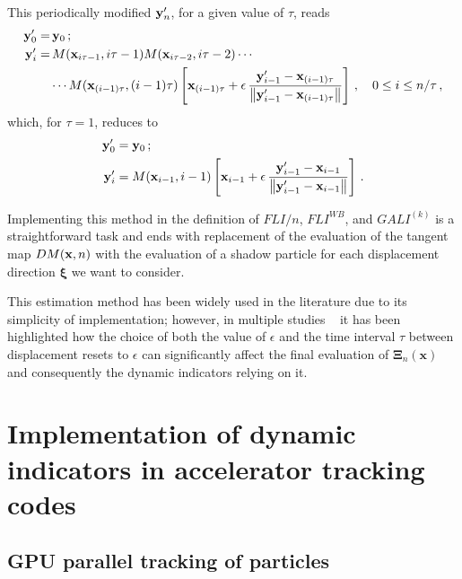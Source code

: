 This periodically modified $\vb{y}'_n$, for a given value of $\tau$, reads
\begin{equation}
    \begin{aligned}
        \vb{y}'_0 =&\, \vb{y}_0 \,;  \\
        \vb{y}'_i =&\, M(\vb{x}_{i\tau - 1}, i\tau - 1)M(\vb{x}_{i\tau - 2}, i\tau - 2)\cdots \\
        &\cdots M(\vb{x}_{(i-1)\tau}, (i-1)\tau)\left[\vb{x}_{(i-1)\tau}+\epsilon\,\frac{\vb{y}'_{i-1}-\vb{x}_{(i-1)\tau}}{\norm{\vb{y}'_{i-1}-\vb{x}_{(i-1)\tau}}}\right]\,, \quad 0 \leq i \leq n/\tau \,,        
    \end{aligned}
\end{equation}
which, for $\tau=1$, reduces to
\begin{equation}
\begin{aligned}
    \vb{y}'_0 &= \vb{y}_0 \,; \\
    \vb{y}'_i &= M(\vb{x}_{i-1}, i-1)\left[\vb{x}_{i-1}+\epsilon\,\frac{\vb{y}'_{i-1}-\vb{x}_{i-1}}{\norm{\vb{y}'_{i-1}-\vb{x}_{i-1}}}\right]\,.
\end{aligned}
\end{equation}

Implementing this method in the definition of $FLI/n$, $FLI^{WB}$, and $GALI^{(k)}$ is a straightforward task and ends with replacement of the evaluation of the tangent map $DM(\vb{x}, n)$ with the evaluation of a shadow particle for each displacement direction $\boldsymbol{\xi}$ we want to consider.

This estimation method has been widely used in the literature due to its simplicity of implementation; however, in multiple studies ~\cite{Tancredi_2001, Skokos2010b} it has been highlighted how the choice of both the value of $\epsilon$ and the time interval $\tau$ between displacement resets to $\epsilon$ can significantly affect the final evaluation of $\boldsymbol{\Xi}_{n}(\mathbf{x})$ and consequently the dynamic indicators relying on it.


\section{Implementation of dynamic indicators in accelerator tracking codes} \label{sec:8:implement}
%

\subsection{GPU parallel tracking of particles}

